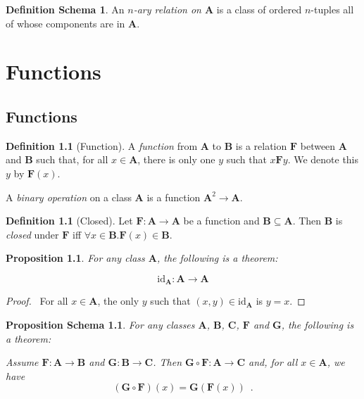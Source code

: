 \documentclass{book}
\let\qed\relax
\newtheorem{prop}[ax]{Proposition}
\newtheorem{props}[ax]{Proposition Schema}
\theoremstyle{definition}
\newtheorem{df}[ax]{Definition}
\newtheorem{dfs}[ax]{Definition Schema}
\begin{document}
\begin{dfs}
An \emph{$n$-ary relation on $\mathbf{A}$} is a class of ordered $n$-tuples all of whose components are in $\mathbf{A}$.
\end{dfs}

\chapter{Functions}

\section{Functions}

\begin{df}[Function]
A \emph{function} from $\mathbf{A}$ to $\mathbf{B}$ is a relation $\mathbf{F}$ between $\mathbf{A}$ and $\mathbf{B}$ such that, for all $x \in \mathbf{A}$, there is only one $y$ such that $x \mathbf{F} y$. We denote this $y$ by $\mathbf{F}(x)$.

A \emph{binary operation} on a class $\mathbf{A}$ is a function $\mathbf{A}^2 \rightarrow \mathbf{A}$.
\end{df}

\begin{df}[Closed]
Let $\mathbf{F} : \mathbf{A} \rightarrow \mathbf{A}$ be a function and $\mathbf{B} \subseteq \mathbf{A}$. Then $\mathbf{B}$ is \emph{closed} under $\mathbf{F}$ iff $\forall x \in \mathbf{B}. \mathbf{F}(x) \in \mathbf{B}$.
\end{df}

\begin{prop}
For any class $\mathbf{A}$, the following is a theorem:

\[ \mathrm{id}_\mathbf{A} : \mathbf{A} \rightarrow \mathbf{A} \]
\end{prop}

\begin{proof}
\pf\ For all $x \in \mathbf{A}$, the only $y$ such that $(x,y) \in \mathrm{id}_\mathbf{A}$ is $y = x$. \qed
\end{proof}

\begin{props}
For any classes $\mathbf{A}$, $\mathbf{B}$, $\mathbf{C}$, $\mathbf{F}$ and $\mathbf{G}$, the following is a theorem:

Assume $\mathbf{F} : \mathbf{A} \rightarrow \mathbf{B}$ and $\mathbf{G} : \mathbf{B} \rightarrow \mathbf{C}$. Then $\mathbf{G} \circ \mathbf{F} : \mathbf{A} \rightarrow \mathbf{C}$ and, for all $x \in \mathbf{A}$, we have
\[ (\mathbf{G} \circ \mathbf{F})(x) = \mathbf{G}(\mathbf{F}(x)) \enspace . \]
\end{props}
\end{document}
